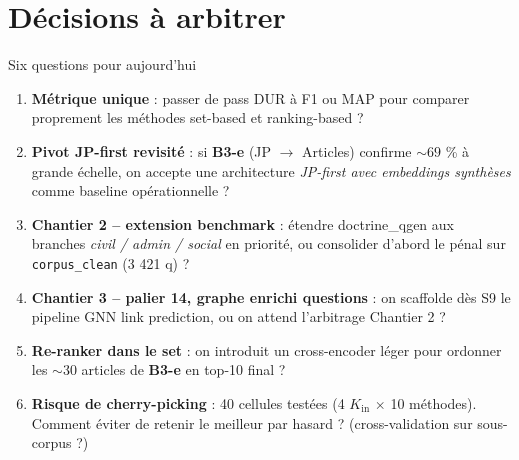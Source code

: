 \documentclass[aspectratio=169,10pt]{beamer}
\begin{document}
\section{Décisions à arbitrer}

\begin{frame}{Six questions pour aujourd'hui}
  \footnotesize
  \begin{enumerate}\setlength\itemsep{0.5em}
    \item \textbf{Métrique unique} : passer de \og pass DUR \fg{} à F1 ou MAP pour
    comparer proprement les méthodes set-based et ranking-based ?

    \item \textbf{Pivot JP-first revisité} : si \textbf{B3-e} (JP $\to$ Articles)
    confirme $\sim 69$ \% à grande échelle, on accepte une architecture
    \emph{JP-first avec embeddings synthèses} comme baseline opérationnelle ?

    \item \textbf{Chantier 2 -- extension benchmark} : étendre doctrine\_qgen aux
    branches \emph{civil / admin / social} en priorité, ou consolider d'abord le pénal
    sur \texttt{corpus\_clean} (3 421 q) ?

    \item \textbf{Chantier 3 -- palier 14, graphe enrichi questions} :
    on scaffolde dès S9 le pipeline GNN link prediction, ou on attend l'arbitrage Chantier 2 ?

    \item \textbf{Re-ranker dans le set} : on introduit un cross-encoder léger pour
    ordonner les ${\sim}30$ articles de \textbf{B3-e} en top-10 final ?

    \item \textbf{Risque de cherry-picking} : 40 cellules testées (4 $K_\text{in}$ $\times$ 10 méthodes).
    Comment éviter de retenir le meilleur par hasard ? (cross-validation sur sous-corpus ?)
  \end{enumerate}
\end{frame}
\end{document}
